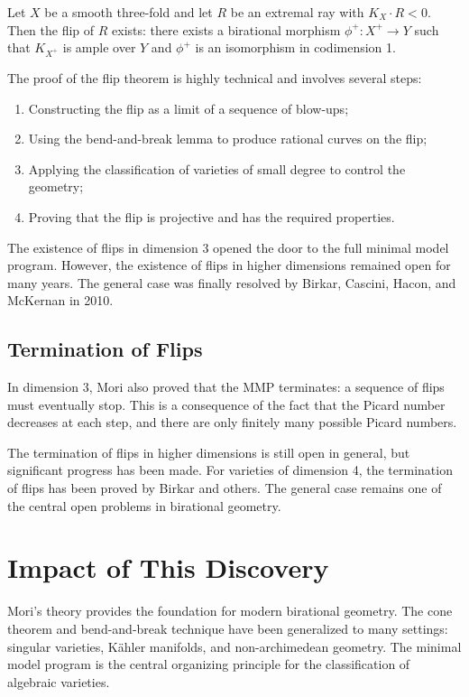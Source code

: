 \begin{theorem}
Let $X$ be a smooth three-fold and let $R$ be an extremal ray with $K_X \cdot
R < 0$. Then the flip of $R$ exists: there exists a birational morphism
$\phi^+: X^+ \to Y$ such that $K_{X^+}$ is ample over $Y$ and $\phi^+$ is an
isomorphism in codimension 1.
\end{theorem}

The proof of the flip theorem is highly technical and involves several steps:
\begin{enumerate}
    \item Constructing the flip as a limit of a sequence of blow-ups;
    \item Using the bend-and-break lemma to produce rational curves on the flip;
    \item Applying the classification of varieties of small degree to control
    the geometry;
    \item Proving that the flip is projective and has the required properties.
\end{enumerate}

The existence of flips in dimension 3 opened the door to the full minimal model
program. However, the existence of flips in higher dimensions remained open for
many years. The general case was finally resolved by Birkar, Cascini, Hacon,
and McKernan in 2010.

\subsection*{Termination of Flips}

In dimension 3, Mori also proved that the MMP terminates: a sequence of flips
must eventually stop. This is a consequence of the fact that the Picard number
decreases at each step, and there are only finitely many possible Picard numbers.

The termination of flips in higher dimensions is still open in general, but
significant progress has been made. For varieties of dimension 4, the termination
of flips has been proved by Birkar and others. The general case remains one of
the central open problems in birational geometry.

\section{Impact of This Discovery}

Mori's theory provides the foundation for modern birational geometry. The cone
theorem and bend-and-break technique have been generalized to many settings:
singular varieties, K\"ahler manifolds, and non-archimedean geometry. The
minimal model program is the central organizing principle for the classification
of algebraic varieties.

